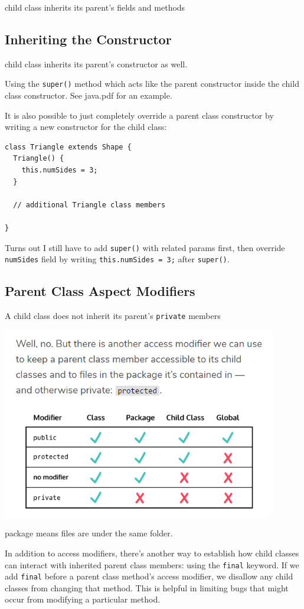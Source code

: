 \documentclass[a4paper, 12pt]{article}
\begin{document}
child class inherits its parent's fields and methods

\subsection{Inheriting the Constructor}
child class inherits its parent's constructor as well. 

Using the \verb|super()| method which acts like the parent constructor inside the child class constructor. See java.pdf for an example.

It is also possible to just completely override a parent class constructor by writing a new constructor for the child class:
\begin{verbatim}
class Triangle extends Shape {
  Triangle() {
    this.numSides = 3;
  }

  // additional Triangle class members

}
\end{verbatim}
Turns out I still have to add \verb|super()| with related params first, then override \verb|numSides| field by writing \verb|this.numSides = 3;| after \verb|super()|.

\subsection{Parent Class Aspect Modifiers}
A child class does not inherit its parent's \verb|private| members

\includegraphics[width=12cm]{pics/accessModifiers.png}

package means files are under the same folder.

In addition to access modifiers, there's another way to establish how child classes can interact with inherited parent class members: using the \verb|final| keyword. If we add \verb|final| before a parent class method's access modifier, we disallow any child classes from changing that method. This is helpful in limiting bugs that might occur from modifying a particular method.
\end{document}

